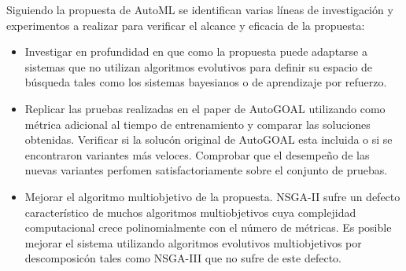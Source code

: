\begin{recomendations}
Siguiendo la propuesta de AutoML se identifican varias l\'ineas de investigaci\'on y experimentos a realizar para verificar el alcance y eficacia de la propuesta:
\begin{itemize}
    \item Investigar en profundidad en que como la propuesta puede adaptarse a sistemas que no utilizan algoritmos evolutivos para definir su espacio de b\'usqueda tales como los sistemas bayesianos o de aprendizaje por refuerzo.
    \item Replicar las pruebas realizadas en el paper de AutoGOAL utilizando como m\'etrica adicional al tiempo de entrenamiento y comparar las soluciones obtenidas. Verificar si la soluc\'on original de AutoGOAL esta incluida o si se encontraron variantes m\'as veloces. Comprobar que el desempe\~no de las  nuevas variantes  perfomen satisfactoriamente sobre el conjunto de pruebas.
    \item Mejorar el algoritmo multiobjetivo de la propuesta. NSGA-II sufre un defecto caracter\'istico de muchos algoritmos multiobjetivos cuya complejidad computacional crece polinomialmente con el n\'umero de m\'etricas. Es posible mejorar el sistema utilizando algoritmos evolutivos multiobjetivos por descomposic\'on tales como NSGA-III que no sufre de este defecto.
\end{itemize}

\end{recomendations}
